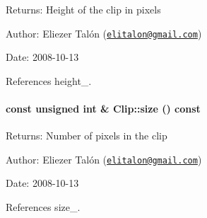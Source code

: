 \begin{Desc}
\item[Returns:]Height of the clip in pixels\end{Desc}
\begin{Desc}
\item[Author:]Eliezer Talón (\href{mailto:elitalon@gmail.com}{\tt elitalon@gmail.com}) \end{Desc}
\begin{Desc}
\item[Date:]2008-10-13 \end{Desc}


References height\_\-.\hypertarget{class_clip_eb6b12a1a0570b529d6a09633b991fcd}{
\paragraph[size]{\setlength{\rightskip}{0pt plus 5cm}const unsigned int \& Clip::size () const}\hfill}
\label{class_clip_eb6b12a1a0570b529d6a09633b991fcd}


\begin{Desc}
\item[Returns:]Number of pixels in the clip\end{Desc}
\begin{Desc}
\item[Author:]Eliezer Talón (\href{mailto:elitalon@gmail.com}{\tt elitalon@gmail.com}) \end{Desc}
\begin{Desc}
\item[Date:]2008-10-13 \end{Desc}


References size\_\-.